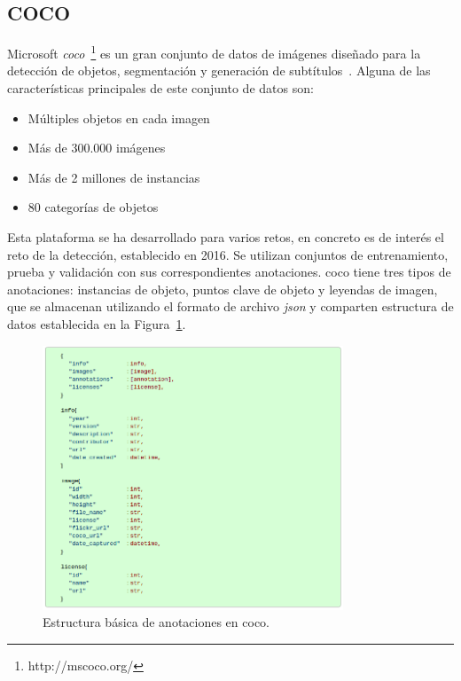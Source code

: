 \subsection{COCO} \label{sec.coco}
Microsoft \textit{\acrfull{coco}}~\footnote{http://mscoco.org/} es un gran conjunto de datos de imágenes diseñado para la detección de objetos, segmentación y generación de subtítulos~\cite{veit2016cocotext}. Alguna de las características principales de este conjunto de datos son:
	\begin{itemize}
         \item Múltiples objetos en cada imagen
     	 \item Más de 300.000 imágenes
         \item Más de 2 millones de instancias
         \item 80 categorías de objetos
    \end{itemize}
    
Esta plataforma se ha desarrollado para varios retos, en concreto es de interés el reto de la detección, establecido en 2016. Se utilizan conjuntos de entrenamiento, prueba y validación con sus correspondientes anotaciones. \acrshort{coco} tiene tres tipos de anotaciones: instancias de objeto, puntos clave de objeto y leyendas de imagen, que se almacenan utilizando el formato de archivo \textit{\acrfull{json}} y comparten estructura de datos establecida en la Figura~\ref{fig.basicStruc}. \\

\begin{figure}[H]
	\begin{center}
		\includegraphics[width=0.8\textwidth]{figures/basic_structure_annotations.png}
		\caption{Estructura básica de anotaciones en \acrshort{coco}.}
		\label{fig.basicStruc}
	\end{center}
\end{figure} 

